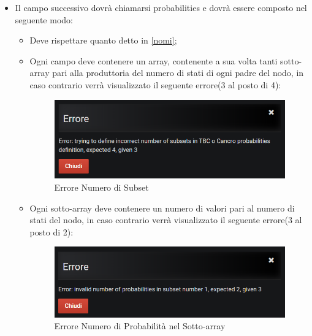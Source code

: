 \begin{itemize}
\begin{itemize}
	\end{itemize}
	
	\item Il campo successivo dovrà chiamarsi probabilities e dovrà essere composto nel seguente modo:
	
	\begin{itemize}
		\item Deve rispettare quanto detto  in \ref{nomi};
		\item Ogni campo deve contenere un array, contenente a sua volta tanti sotto-array pari alla produttoria del numero di stati di ogni padre del nodo, in caso contrario verrà visualizzato il seguente errore(3 al posto di 4):
		
		\begin{figure}[H]
	\begin{center}
		\includegraphics[scale=0.6]{./images/wrongSubsets.png}
		 \caption{Errore Numero di Subset}	
		 \label{erWrongSubsets}
	\end{center}
	\end{figure}	
		
		\item Ogni sotto-array deve contenere un numero di valori pari al numero di stati del nodo, in caso contrario verrà visualizzato il seguente errore(3 al posto di 2): 
		
		\begin{figure}[H]
	\begin{center}
		\includegraphics[scale=0.6]{./images/numberProbs.png}
		 \caption{Errore Numero di Probabilità nel Sotto-array}	
		 \label{erWrongSubsets}
	\end{center}
	\end{figure}	
	

\end{itemize}
\end{itemize}
